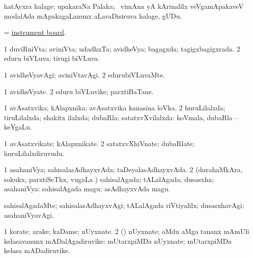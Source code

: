 \bentry
{}
\gl{\nA}
\bmng
hatAyxra halage; upakaraNa Palaka; \kanmu\ vimAna yA kArinalilx veVgamApakaveV modalAda mApakagaLanunx aLavaDisiruva halage, gUDu. 
\emng
\eentry

\bentry
{}
\gl{\nA}
\bmng
= \hyperlink{instrument board}{instrument board}. 
\emng
\eentry

\bentry
{}
\gl{\gu}
\bmng
\bnum
\num{1} duviRniVta; aviniVta; udadhxTa; avidheVya; bagagxda; tagigxbagigxrada. 
\num{2} eduru biVLuva; tirugi biVLuva. 
\enum
\emng
\eentry

\bentry
{}
\gl{\kirxvi}
\bmng
\bnum
\num{1} avidheVyavAgi; aviniVtavAgi. 
\num{2} edurubiVLuvaMte. 
\enum
\emng
\eentry

\bentry
{}
\gl{\nA}
\bmng
\bnum
\num{1} avidheVyate. 
\num{2} eduru biVLuvike; parxtiBaTane. 
\enum
\emng
\eentry

\bentry
{}
\gl{\gu}
\bmng
\bnum
\num{1} avAsatxvika; kAlapxnika:  avAsatxvika kanasina loVka. 
\num{2} huruLilalxda; tiruLilalxda; shakitx ilalxda; dubaRla; satatxvXvilalxda:  koVmala, dubaRla -- keYgaLu. 
\enum
\emng
\eentry

\bentry
{}
\gl{\nA}
\bmng
\bnum
\num{1} avAsatxvikate; kAlapxnikate. 
\num{2} satatxvXhiVnate; dubaRlate; huruLilalxdiruvudu. 
\enum
\emng
\eentry

\bentry
{}
\gl{\gu}
\bmng
\bnum
\num{1} asahaniVya; sahisalasAdhayxvAda; taDeyalasAdhayxvAda. 
\num{2} (durahaMkAra, sokukx, parxtiSeThx, \mo vugaLa \vi) sahisalAgada; tALalAgada; dusasxha; asahaniVya:  sahisalAgada magu; asAdhayxvAda magu. 
\enum
\emng
\eentry

\bentry
{}
\gl{\kirxvi}
\bmng
sahisalAgadaMte; sahisalasAdhayxvAgi; tALalAgada riVtiyalilx; dusasxhavAgi; asahaniVyavAgi. 
\emng
\eentry

\bentry
{}
\gl{\nA}
\bmng
\bnum
\num{1} korate; arake; kaDame; nUyxnate. 
\num{2} (\veYshA) nUyxnate; oMdu aMga tananx mAmUli kelasavanunx mADalAgadiruvike:  mUtarxpiMDa nUyxnate; mUtarxpiMDa kelasa mADadiruvike. 
\enum
\emng
\eentry

